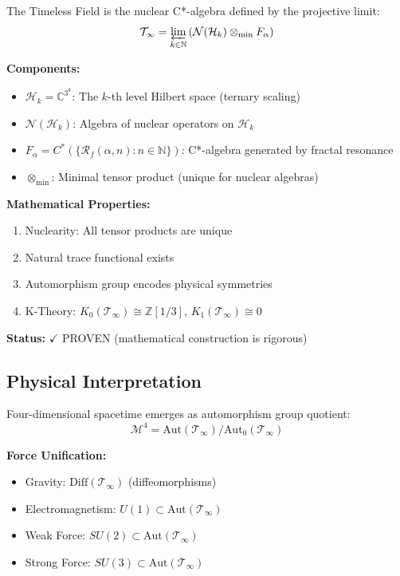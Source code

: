 The Timeless Field is the nuclear C*-algebra defined by the projective limit:
\begin{equation}
\mathcal{T}_\infty = \varprojlim_{k \in \mathbb{N}} \left(\mathcal{N}(\mathcal{H}_k) \otimes_{\min} F_\alpha\right)
\end{equation}

\textbf{Components:}
\begin{itemize}
\item $\mathcal{H}_k = \mathbb{C}^{3^k}$: The $k$-th level Hilbert space (ternary scaling)
\item $\mathcal{N}(\mathcal{H}_k)$: Algebra of nuclear operators on $\mathcal{H}_k$
\item $F_\alpha = C^*(\{\mathcal{R}_f(\alpha,n) : n \in \mathbb{N}\})$: C*-algebra generated by fractal resonance
\item $\otimes_{\min}$: Minimal tensor product (unique for nuclear algebras)
\end{itemize}

\textbf{Mathematical Properties:}
\begin{enumerate}
\item Nuclearity: All tensor products are unique
\item Natural trace functional exists
\item Automorphism group encodes physical symmetries
\item K-Theory: $K_0(\mathcal{T}_\infty) \cong \mathbb{Z}[1/3]$, $K_1(\mathcal{T}_\infty) \cong 0$
\end{enumerate}

\textbf{Status:} $\checkmark$ PROVEN (mathematical construction is rigorous)

\subsection{Physical Interpretation}

Four-dimensional spacetime emerges as automorphism group quotient:
\begin{equation}
\mathcal{M}^4 = \text{Aut}(\mathcal{T}_\infty) / \text{Aut}_0(\mathcal{T}_\infty)
\end{equation}

\textbf{Force Unification:}
\begin{itemize}
\item Gravity: $\text{Diff}(\mathcal{T}_\infty)$ (diffeomorphisms)
\item Electromagnetism: $U(1) \subset \text{Aut}(\mathcal{T}_\infty)$
\item Weak Force: $SU(2) \subset \text{Aut}(\mathcal{T}_\infty)$
\item Strong Force: $SU(3) \subset \text{Aut}(\mathcal{T}_\infty)$
\end{itemize}

